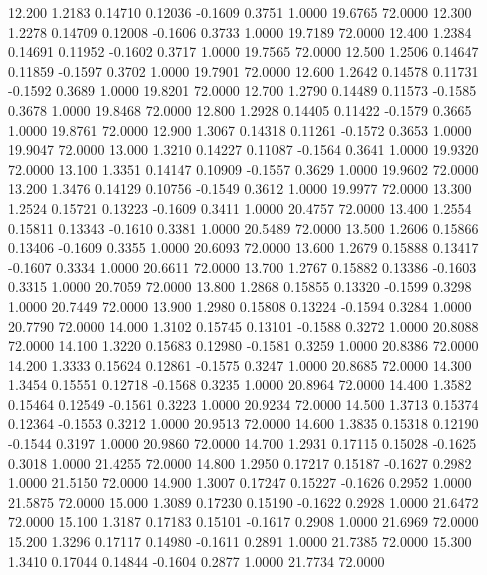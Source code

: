   12.200   1.2183   0.14710   0.12036  -0.1609   0.3751   1.0000  19.6765  72.0000
  12.300   1.2278   0.14709   0.12008  -0.1606   0.3733   1.0000  19.7189  72.0000
  12.400   1.2384   0.14691   0.11952  -0.1602   0.3717   1.0000  19.7565  72.0000
  12.500   1.2506   0.14647   0.11859  -0.1597   0.3702   1.0000  19.7901  72.0000
  12.600   1.2642   0.14578   0.11731  -0.1592   0.3689   1.0000  19.8201  72.0000
  12.700   1.2790   0.14489   0.11573  -0.1585   0.3678   1.0000  19.8468  72.0000
  12.800   1.2928   0.14405   0.11422  -0.1579   0.3665   1.0000  19.8761  72.0000
  12.900   1.3067   0.14318   0.11261  -0.1572   0.3653   1.0000  19.9047  72.0000
  13.000   1.3210   0.14227   0.11087  -0.1564   0.3641   1.0000  19.9320  72.0000
  13.100   1.3351   0.14147   0.10909  -0.1557   0.3629   1.0000  19.9602  72.0000
  13.200   1.3476   0.14129   0.10756  -0.1549   0.3612   1.0000  19.9977  72.0000
  13.300   1.2524   0.15721   0.13223  -0.1609   0.3411   1.0000  20.4757  72.0000
  13.400   1.2554   0.15811   0.13343  -0.1610   0.3381   1.0000  20.5489  72.0000
  13.500   1.2606   0.15866   0.13406  -0.1609   0.3355   1.0000  20.6093  72.0000
  13.600   1.2679   0.15888   0.13417  -0.1607   0.3334   1.0000  20.6611  72.0000
  13.700   1.2767   0.15882   0.13386  -0.1603   0.3315   1.0000  20.7059  72.0000
  13.800   1.2868   0.15855   0.13320  -0.1599   0.3298   1.0000  20.7449  72.0000
  13.900   1.2980   0.15808   0.13224  -0.1594   0.3284   1.0000  20.7790  72.0000
  14.000   1.3102   0.15745   0.13101  -0.1588   0.3272   1.0000  20.8088  72.0000
  14.100   1.3220   0.15683   0.12980  -0.1581   0.3259   1.0000  20.8386  72.0000
  14.200   1.3333   0.15624   0.12861  -0.1575   0.3247   1.0000  20.8685  72.0000
  14.300   1.3454   0.15551   0.12718  -0.1568   0.3235   1.0000  20.8964  72.0000
  14.400   1.3582   0.15464   0.12549  -0.1561   0.3223   1.0000  20.9234  72.0000
  14.500   1.3713   0.15374   0.12364  -0.1553   0.3212   1.0000  20.9513  72.0000
  14.600   1.3835   0.15318   0.12190  -0.1544   0.3197   1.0000  20.9860  72.0000
  14.700   1.2931   0.17115   0.15028  -0.1625   0.3018   1.0000  21.4255  72.0000
  14.800   1.2950   0.17217   0.15187  -0.1627   0.2982   1.0000  21.5150  72.0000
  14.900   1.3007   0.17247   0.15227  -0.1626   0.2952   1.0000  21.5875  72.0000
  15.000   1.3089   0.17230   0.15190  -0.1622   0.2928   1.0000  21.6472  72.0000
  15.100   1.3187   0.17183   0.15101  -0.1617   0.2908   1.0000  21.6969  72.0000
  15.200   1.3296   0.17117   0.14980  -0.1611   0.2891   1.0000  21.7385  72.0000
  15.300   1.3410   0.17044   0.14844  -0.1604   0.2877   1.0000  21.7734  72.0000
